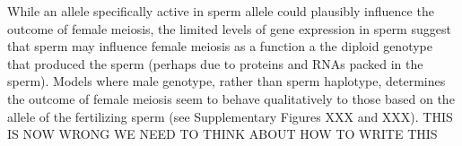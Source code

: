 \documentclass[12pt,letterpaper]{article}
\newcommand{\yb}[1]{{ \color{blue} #1}}
\begin{document}



While an allele specifically active in sperm allele  could plausibly influence the outcome of female meiosis, the limited levels of gene expression in sperm 
	suggest that sperm may influence female meiosis as a function a the diploid genotype that produced the sperm (perhaps due to proteins and RNAs packed in the sperm).
Models where male genotype, rather than sperm haplotype, determines the outcome of female meiosis 
	seem to behave qualitatively to those based on the allele of the
	fertilizing sperm (see Supplementary Figures XXX and XXX).
	\yb{THIS IS NOW WRONG WE NEED TO THINK ABOUT HOW TO WRITE THIS}

\end{document}
